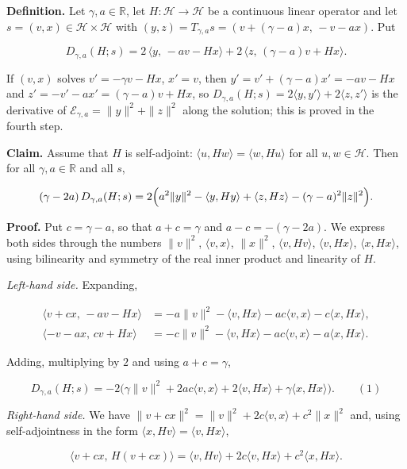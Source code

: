 \documentclass[11pt,a4paper]{article}
\begin{document}
\textbf{Definition.} Let \(\gamma,a\in\mathbb R\), let \(H:\mathcal H\to\mathcal H\) be a continuous linear operator and let \(s=(v,x)\in\mathcal H\times\mathcal H\) with \((y,z)=T_{\gamma,a}s=(v+(\gamma-a)x,\,-v-ax)\). Put


\[D_{\gamma,a}(H;s)=2\,\langle y,\,-a v-Hx\rangle+2\,\langle z,\,(\gamma-a)v+Hx\rangle .\]


If \((v,x)\) solves \(v'=-\gamma v-Hx\), \(x'=v\), then \(y'=v'+(\gamma-a)x'=-av-Hx\) and \(z'=-v'-ax'=(\gamma-a)v+Hx\), so \(D_{\gamma,a}(H;s)=2\langle y,y'\rangle+2\langle z,z'\rangle\) is the derivative of \(\mathcal E_{\gamma,a}=\|y\|^2+\|z\|^2\) along the solution; this is proved in the fourth step.




\textbf{Claim.} Assume that \(H\) is self-adjoint: \(\langle u,Hw\rangle=\langle w,Hu\rangle\) for all \(u,w\in\mathcal H\). Then for all \(\gamma,a\in\mathbb R\) and all \(s\),


\[(\gamma-2a)\,D_{\gamma,a}(H;s)=2\Bigl(a^2\|y\|^2-\langle y,Hy\rangle+\langle z,Hz\rangle-(\gamma-a)^2\|z\|^2\Bigr).\]


\textbf{Proof.} Put \(c=\gamma-a\), so that \(a+c=\gamma\) and \(a-c=-(\gamma-2a)\). We express both sides through the numbers \(\|v\|^2\), \(\langle v,x\rangle\), \(\|x\|^2\), \(\langle v,Hv\rangle\), \(\langle v,Hx\rangle\), \(\langle x,Hx\rangle\), using bilinearity and symmetry of the real inner product and linearity of \(H\).




\emph{Left-hand side.} Expanding,


\[\begin{aligned}
\langle v+cx,\,-av-Hx\rangle&=-a\|v\|^2-\langle v,Hx\rangle-ac\langle v,x\rangle-c\langle x,Hx\rangle,\\
\langle -v-ax,\,cv+Hx\rangle&=-c\|v\|^2-\langle v,Hx\rangle-ac\langle v,x\rangle-a\langle x,Hx\rangle .
\end{aligned}\]


Adding, multiplying by \(2\) and using \(a+c=\gamma\),


\[D_{\gamma,a}(H;s)=-2\bigl(\gamma\|v\|^2+2ac\langle v,x\rangle+2\langle v,Hx\rangle+\gamma\langle x,Hx\rangle\bigr).\qquad(1)\]


\emph{Right-hand side.} We have \(\|v+cx\|^2=\|v\|^2+2c\langle v,x\rangle+c^2\|x\|^2\) and, using self-adjointness in the form \(\langle x,Hv\rangle=\langle v,Hx\rangle\),


\[\langle v+cx,\,H(v+cx)\rangle=\langle v,Hv\rangle+2c\langle v,Hx\rangle+c^2\langle x,Hx\rangle .\]
\end{document}
